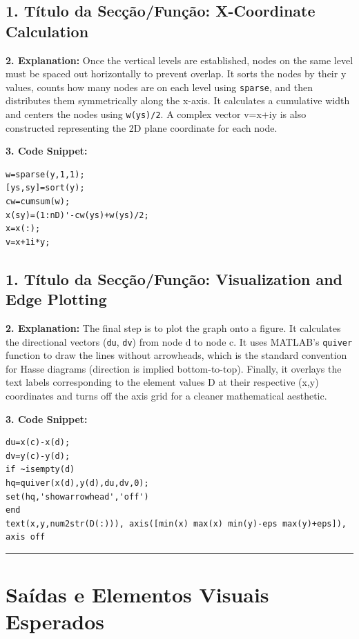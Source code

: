 \vspace{0.5cm}

\subsection*{1. Título da Secção/Função: X-Coordinate Calculation}
\textbf{2. Explanation:} Once the vertical levels are established, nodes on the same level must be spaced out horizontally to prevent overlap. It sorts the nodes by their y values, counts how many nodes are on each level using \texttt{sparse}, and then distributes them symmetrically along the x-axis. It calculates a cumulative width and centers the nodes using \texttt{w(ys)/2}. A complex vector v=x+iy is also constructed representing the 2D plane coordinate for each node.

\textbf{3. Code Snippet:}
\begin{lstlisting}
w=sparse(y,1,1);
[ys,sy]=sort(y);
cw=cumsum(w);
x(sy)=(1:nD)'-cw(ys)+w(ys)/2;
x=x(:);
v=x+1i*y;
\end{lstlisting}

\vspace{0.5cm}

\subsection*{1. Título da Secção/Função: Visualization and Edge Plotting}
\textbf{2. Explanation:} The final step is to plot the graph onto a figure. It calculates the directional vectors (\texttt{du}, \texttt{dv}) from node d to node c. It uses MATLAB's \texttt{quiver} function to draw the lines without arrowheads, which is the standard convention for Hasse diagrams (direction is implied bottom-to-top). Finally, it overlays the text labels corresponding to the element values D at their respective (x,y) coordinates and turns off the axis grid for a cleaner mathematical aesthetic.

\textbf{3. Code Snippet:}
\begin{lstlisting}
du=x(c)-x(d);
dv=y(c)-y(d);
if ~isempty(d)
hq=quiver(x(d),y(d),du,dv,0);
set(hq,'showarrowhead','off')
end
text(x,y,num2str(D(:))), axis([min(x) max(x) min(y)-eps max(y)+eps]), axis off
\end{lstlisting}

\vspace{0.5cm}
\hrule
\vspace{0.5cm}

\section{Saídas e Elementos Visuais Esperados}

